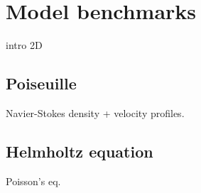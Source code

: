 \chapter{Model benchmarks}
intro 2D

\section{Poiseuille}
Navier-Stokes
density + velocity profiles.

\section{Helmholtz equation}
Poisson's eq. 



